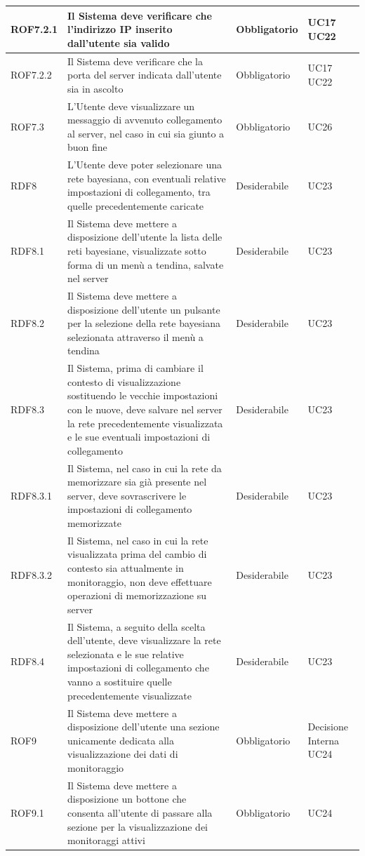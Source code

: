 \begin{center}
\begin{longtable}[c]{|m{}|m{}|m{}|m{}|}
\hline
\rowcolor{grigio}ROF7.2.1 & Il Sistema deve verificare che l'indirizzo IP inserito dall'utente sia valido & Obbligatorio & UC17 UC22\\
\hline
ROF7.2.2 & Il Sistema deve verificare che la porta del server indicata dall'utente sia in ascolto & Obbligatorio & UC17 UC22\\
\hline
\rowcolor{grigio}ROF7.3 & L'Utente deve visualizzare un messaggio di avvenuto collegamento al server, nel caso in cui sia giunto a buon fine & Obbligatorio & UC26\\
\hline
RDF8 & L'Utente deve poter selezionare una rete bayesiana, con eventuali relative impostazioni di collegamento, tra quelle precedentemente caricate & Desiderabile & UC23\\
\hline
\rowcolor{grigio}RDF8.1 & Il Sistema deve mettere a disposizione dell'utente la lista delle reti bayesiane, visualizzate sotto forma di un menù a tendina, salvate nel server & Desiderabile & UC23\\
\hline
RDF8.2 & Il Sistema deve mettere a disposizione dell'utente un pulsante per la selezione della rete bayesiana selezionata attraverso il menù a tendina & Desiderabile & UC23\\
\hline
\rowcolor{grigio}RDF8.3 & Il Sistema, prima di cambiare il contesto di visualizzazione sostituendo le vecchie impostazioni con le nuove, deve salvare nel server la rete precedentemente visualizzata e le sue eventuali impostazioni di collegamento & Desiderabile & UC23\\
\hline
RDF8.3.1 & Il Sistema, nel caso in cui la rete da memorizzare sia già presente nel server, deve sovrascrivere le impostazioni di collegamento memorizzate & Desiderabile & UC23\\
\hline
\rowcolor{grigio}RDF8.3.2 & Il Sistema, nel caso in cui la rete visualizzata prima del cambio di contesto sia attualmente in monitoraggio, non deve effettuare operazioni di memorizzazione su server & Desiderabile & UC23\\
\hline
RDF8.4 & Il Sistema, a seguito della scelta dell'utente, deve visualizzare la rete selezionata e le sue relative impostazioni di collegamento che vanno a sostituire quelle precedentemente visualizzate & Desiderabile & UC23\\
\hline
\rowcolor{grigio}ROF9 & Il Sistema deve mettere a disposizione dell'utente una sezione unicamente dedicata alla visualizzazione dei dati di monitoraggio & Obbligatorio & Decisione Interna UC24\\
\hline
ROF9.1 & Il Sistema deve mettere a disposizione un bottone che consenta all'utente di passare alla sezione per la visualizzazione dei monitoraggi attivi & Obbligatorio & UC24\\

\end{longtable}
\end{center}
